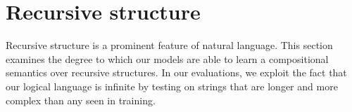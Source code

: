 \section{Recursive structure}\label{sec:recursion}

Recursive structure is a prominent feature of natural language. 
This section examines the degree to which our models are able to learn a 
compositional semantics over recursive structures.
In our evaluations, we exploit the fact that our logical language
is infinite by testing on strings that are longer and more complex
than any seen in training.


